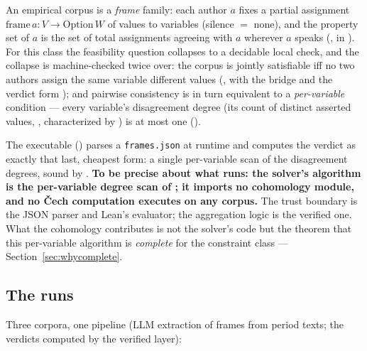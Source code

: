 \documentclass[11pt]{article}
\begin{document}
An empirical corpus is a \emph{frame} family: each author $a$ fixes a
partial assignment $\mathrm{frame}\,a : V \to \mathrm{Option}\,W$ of
values to variables (silence $=$ \textsf{none}), and the property set
of $a$ is the set of total assignments agreeing with $a$ wherever $a$
speaks (, in ).  For
this class the feasibility question collapses to a decidable local
check, and the collapse is machine-checked twice over: the corpus is
jointly satisfiable iff no two authors assign the same variable
different values (, with the bridge
 and the verdict form
); and pairwise consistency is in
turn equivalent to a \emph{per-variable} condition --- every
variable's disagreement degree (its count of distinct asserted
values, , characterized by
) is at most one
().

The executable () parses a
\texttt{frames.json} at runtime and computes the verdict as exactly
that last, cheapest form: a single per-variable scan of the
disagreement degrees, sound by
.  \textbf{To
be precise about what runs: the solver's algorithm is the
per-variable degree scan of ; it imports no
cohomology module, and no \v{C}ech computation executes on any
corpus.}  The trust boundary is the JSON parser and Lean's evaluator;
the aggregation logic is the verified one.  What the cohomology
contributes is not the solver's code but the theorem that this
per-variable algorithm is \emph{complete} for the constraint class
--- Section~\ref{sec:whycomplete}.

\subsection{The runs}

Three corpora, one pipeline (LLM extraction of frames from period
texts; the verdicts computed by the verified layer):
\end{document}
